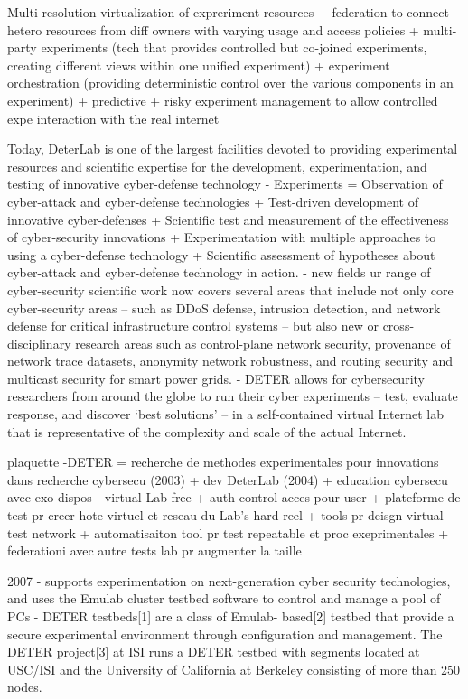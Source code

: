 Multi-resolution virtualization of expreriment resources + federation to connect hetero resources from diff owners with varying usage and access policies + multi-party experiments (tech that provides controlled but co-joined experiments, creating different views within one unified experiment) + experiment orchestration (providing deterministic control over the various components in an experiment) + predictive + risky experiment management to allow controlled expe interaction with the real internet

Today, DeterLab is one of the largest facilities devoted to providing experimental resources and scientific expertise for the development, experimentation, and testing of innovative cyber-defense technology
- Experiments =  Observation of cyber-attack and cyber-defense technologies + Test-driven development of innovative cyber-defenses + Scientific test and measurement of the effectiveness of cyber-security innovations + Experimentation with multiple approaches to using a cyber-defense technology + Scientific assessment of hypotheses about cyber-attack and cyber-defense technology in action.
- new fields     ur range of cyber-security scientific work now covers several areas that include not only core cyber-security areas – such as DDoS defense, intrusion detection, and network defense for critical infrastructure control systems – but also new or cross-disciplinary research areas such as control-plane network security, provenance of network trace datasets, anonymity network robustness, and routing security and multicast security for smart power grids.
- DETER allows for cybersecurity researchers from around the globe to run their cyber experiments – test, evaluate response, and discover ‘best solutions’ – in a self-contained virtual Internet lab that is representative of the complexity and scale of the actual Internet.

plaquette
-DETER = recherche de methodes experimentales pour innovations dans recherche cybersecu (2003) + dev DeterLab (2004) + education cybersecu avec exo dispos
- virtual Lab free + auth control acces pour user + plateforme de test pr creer hote virtuel et reseau du Lab's hard reel + tools pr deisgn  virtual test network + automatisaiton tool pr test repeatable et proc exeprimentales + federationi avec autre tests lab pr augmenter la taille

2007
- supports experimentation on next-generation cyber security technologies, and
uses the Emulab cluster testbed software to control and manage a pool of PCs
- DETER testbeds[1] are a class of Emulab- based[2] testbed that provide a
secure experimental environment through configuration and management.  The DETER
project[3] at ISI runs a DETER testbed with segments located at USC/ISI and the
University of California at Berkeley consisting of more than 250 nodes.
